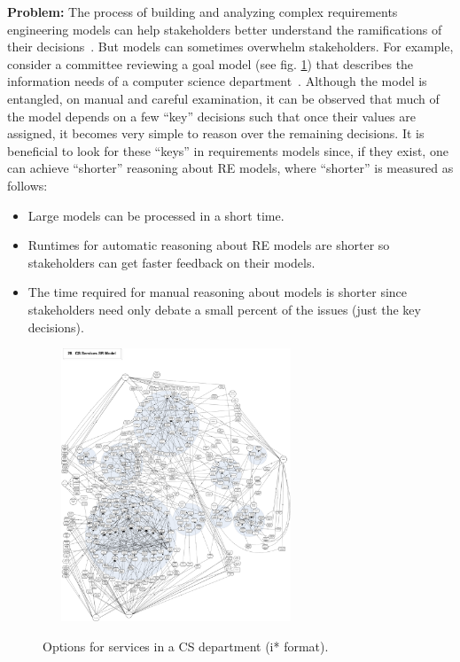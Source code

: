 \documentclass[sigconf]{acmart}
\begin{document}
    \noindent\textbf{Problem:} The process of building and analyzing complex requirements engineering models can help stakeholders better understand the ramifications of their decisions~\cite{Lamsweerde2001,amyot10}. But models can sometimes overwhelm stakeholders. For example, consider a committee reviewing a goal model (see fig. \ref{fig:csServices}) that describes the information needs of a computer science department~\cite{Horkoff2016}. Although the model is entangled, on manual and careful examination, it can be observed that much of the model depends on a few ``key'' decisions such that once their values are assigned, it becomes very simple to reason over the remaining decisions. It is beneficial to look for these ``keys'' in requirements models since, if they exist, one can achieve ``shorter'' reasoning about RE models, where ``shorter'' is measured as follows:
    \begin{itemize}[leftmargin=*]
     \item{Large models can be processed in a short time.}
     \item{Runtimes for automatic reasoning about RE models are shorter so stakeholders can get faster feedback on their models.}
     \item{The time required for manual reasoning about models is shorter since stakeholders need only debate a small percent of the issues (just the key decisions).}
    \end{itemize}
   
    
    \begin{figure}[!t] 
  ~~~\includegraphics[width=2.7in]{img/CSServices.pdf} 
    \caption{Options for services in a CS department (i* format).}
    \label{fig:csServices}
\end{figure}
\end{document}
